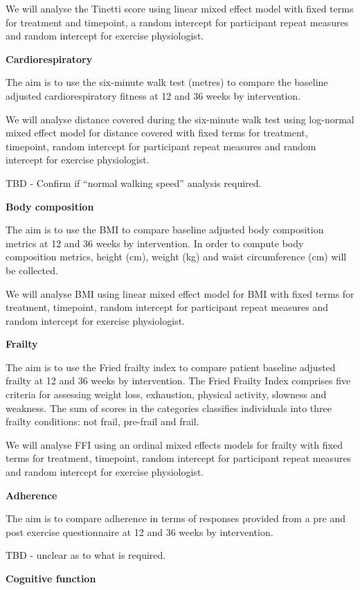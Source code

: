 \documentclass[
]{article}
\begin{document}
We will analyse the Tinetti score using linear mixed effect model with fixed terms for treatment and timepoint, a random intercept for participant repeat measures and random intercept for exercise physiologist.

\textbf{Cardiorespiratory}

The aim is to use the six-minute walk test (metres) to compare the baseline adjusted cardiorespiratory fitness at 12 and 36 weeks by intervention.

We will analyse distance covered during the six-minute walk test using log-normal mixed effect model for distance covered with fixed terms for treatment, timepoint, random intercept for participant repeat measures and random intercept for exercise physiologist.

TBD - Confirm if ``normal walking speed'' analysis required.

\textbf{Body composition}

The aim is to use the BMI to compare baseline adjusted body composition metrics at 12 and 36 weeks by intervention.
In order to compute body composition metrics, height (cm), weight (kg) and waist circumference (cm) will be collected.

We will analyse BMI using linear mixed effect model for BMI with fixed terms for treatment, timepoint, random intercept for participant repeat measures and random intercept for exercise physiologist.

\textbf{Frailty}

The aim is to use the Fried frailty index to compare patient baseline adjusted frailty at 12 and 36 weeks by intervention.
The Fried Frailty Index comprises five criteria for assessing weight loss, exhaustion, physical activity, slowness and weakness.
The sum of scores in the categories classifies individuals into three frailty conditions: not frail, pre-frail and frail.

We will analyse FFI using an ordinal mixed effects models for frailty with fixed terms for treatment, timepoint, random intercept for participant repeat measures and random intercept for exercise physiologist.

\textbf{Adherence}

The aim is to compare adherence in terms of responses provided from a pre and post exercise questionnaire at 12 and 36 weeks by intervention.

TBD - unclear as to what is required.

\textbf{Cognitive function}
\end{document}
